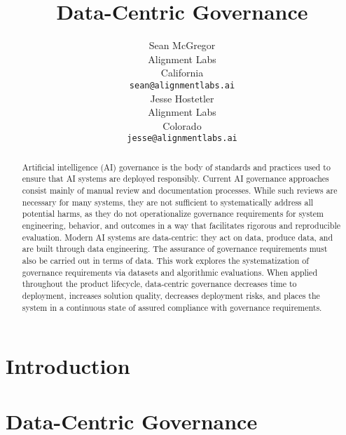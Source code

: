 \documentclass{article}
\title{Data-Centric Governance}
\author{%
  Sean McGregor \\ %
  Alignment Labs\\
  California \\
  \texttt{sean@alignmentlabs.ai} \\
  \And
  Jesse Hostetler \\
  Alignment Labs\\
  Colorado \\
  \texttt{jesse@alignmentlabs.ai} \\
}
\newcommand{\highlight}[1]{
\begin{mdframed}[hidealllines=true,backgroundcolor=black!5] #1\end{mdframed}}
\begin{document}
\maketitle

\begin{abstract}
Artificial intelligence (AI) governance is the body of standards and practices used to ensure that AI systems are deployed responsibly. Current AI governance approaches consist mainly of manual review and documentation processes. While such reviews are necessary for many systems, they are not sufficient to  systematically address all potential harms, as they do not operationalize governance requirements for system engineering, behavior, and outcomes in a way that facilitates rigorous and reproducible evaluation. Modern AI systems are data-centric: they act on data, produce data, and are built through data engineering. The assurance of governance requirements must also be carried out in terms of data. This work explores the systematization of governance requirements via datasets and algorithmic evaluations. When applied throughout the product lifecycle, data-centric governance decreases time to deployment, increases solution quality, decreases deployment risks, and places the system in a continuous state of assured compliance with governance requirements.
\end{abstract}




\section{Introduction}
\label{sec:intro}


\section{Data-Centric Governance}
\label{sec:datagovernance}

\end{document}
